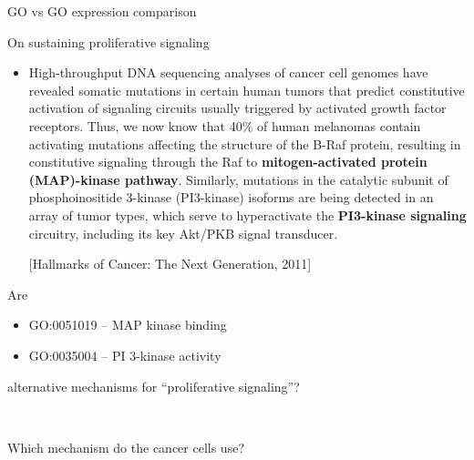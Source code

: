 \documentclass[onepage]{beamer}
\begin{document}
\begin{frame}[t]{GO vs GO expression comparison}{}

	On sustaining proliferative signaling
	\begin{itemize}
	\item
		High-throughput DNA sequencing analyses of cancer cell genomes have revealed somatic mutations in certain human tumors that predict constitutive activation of signaling circuits usually triggered by activated growth factor receptors. Thus, we now know that 40\% of human melanomas contain activating mutations affecting the structure of the B-Raf protein, resulting in constitutive signaling through the Raf to \textbf{mitogen-activated protein (MAP)-kinase pathway}. Similarly, mutations in the catalytic subunit of phosphoinositide 3-kinase (PI3-kinase) isoforms are being detected in an array of tumor types, which serve to hyperactivate the \textbf{PI3-kinase signaling} circuitry, including its key Akt/PKB signal transducer.
		
		{\scriptsize
		[Hallmarks of Cancer: The Next Generation, 2011]
		}
	\end{itemize}
\end{frame}


\begin{frame}[t]{}{}
	Are
	\begin{itemize}
	\item
		GO:0051019 -- MAP kinase binding
	\item
		GO:0035004 -- PI 3-kinase activity
	\end{itemize}
	alternative mechanisms for ``proliferative signaling''?
	
	{\ }
	
	Which mechanism do the cancer cells use?
\end{frame}

\end{document}
